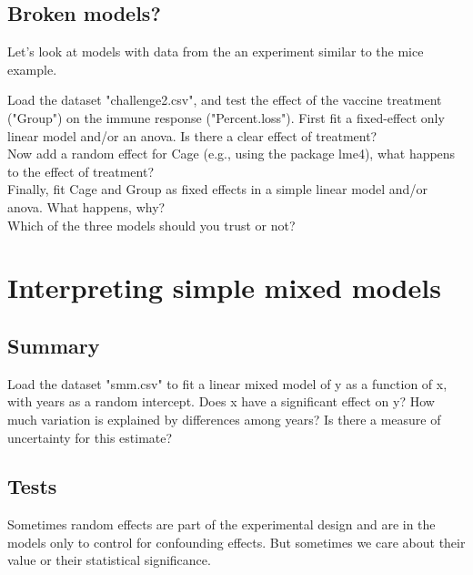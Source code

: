 \documentclass[12pt,a4paper]{scrartcl}\usepackage[]{graphicx}\usepackage[]{color}
\begin{document}
\subsection{Broken models?}

Let's look at models with data from the an experiment similar to the mice example.
\begin{Exercise}[difficulty=1, title={lm vs. lmer vs. lm+}]

Load the dataset "challenge2.csv", and test the effect of the vaccine treatment ("Group") on the immune response ("Percent.loss"). 
First fit a fixed-effect only linear model and/or an anova. Is there a clear effect of treatment?\\
Now add a random effect for Cage (e.g., using the package lme4), what happens to the effect of treatment?\\
Finally, fit Cage and Group as fixed effects in a simple linear model and/or anova. What happens, why?\\
Which of the three models should you trust or not?

\end{Exercise}




\section{Interpreting simple mixed models}

\subsection{Summary}



\begin{Exercise}[difficulty=1, title={Reading a summary in lme4}]
Load the dataset "smm.csv" to fit a linear mixed model of y as a function of x, with years as a random intercept. 
Does x have a significant effect on y?
How much variation is explained by differences among years? Is there a measure of uncertainty for this estimate?
\end{Exercise}


\subsection{Tests}
Sometimes random effects are part of the experimental design and are in the models only to control for confounding effects. But sometimes we care about their value or their statistical significance.
\end{document}
